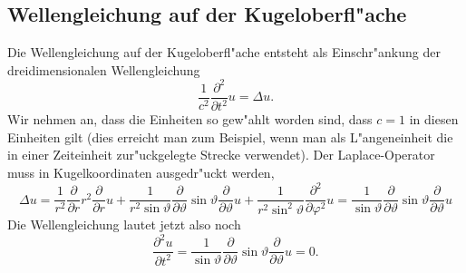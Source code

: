 \subsection{Wellengleichung auf der Kugeloberfl"ache}
Die Wellengleichung auf der Kugeloberfl"ache entsteht als 
Einschr"ankung der dreidimensionalen Wellengleichung
\[
\frac1{c^2} \frac{\partial^2}{\partial t^2}u =\Delta u.
\]
Wir nehmen an, dass die Einheiten so gew"ahlt worden sind,
dass $c=1$ in diesen Einheiten gilt (dies erreicht man zum
Beispiel, wenn man als L"angeneinheit die in einer Zeiteinheit
zur"uckgelegte Strecke verwendet).
Der Laplace-Operator muss in Kugelkoordinaten ausgedr"uckt werden,
\[
\Delta u
=
\frac1{r^2} \frac{\partial}{\partial r}r^2\frac{\partial}{\partial r}u
+
\frac1{r^2\sin\vartheta}
\frac{\partial}{\partial\vartheta}
\sin\vartheta
\frac{\partial}{\partial\vartheta}
u
+
\frac1{r^2\sin^2\vartheta}\frac{\partial^2}{\partial\varphi^2}u
=
\frac1{\sin\vartheta}
\frac{\partial}{\partial\vartheta}
\sin\vartheta
\frac{\partial}{\partial\vartheta}
u
\]
Die Wellengleichung lautet jetzt also noch
\begin{equation}
\frac{\partial^2u}{\partial t^2}=
\frac1{\sin\vartheta}
\frac{\partial}{\partial\vartheta}
\sin\vartheta
\frac{\partial}{\partial\vartheta}
u=0.
\label{tsunami-gleichung}
\end{equation}

